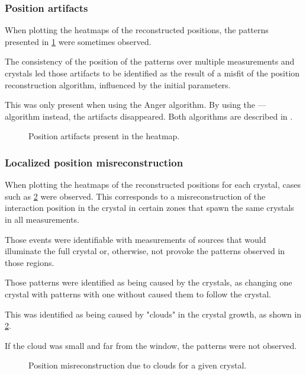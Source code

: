 \subsubsection{Position artifacts}

When plotting the heatmaps of the reconstructed positions, the patterns presented in \ref{fig:PositionArtifactsHeatmap} were sometimes observed.

The consistency of the position of the patterns over multiple measurements and crystals led those artifacts to be identified as the result of a misfit of the position reconstruction algorithm, influenced by the initial parameters.

This was only present when using the Anger algorithm. By using the --- algorithm instead, the artifacts disappeared. Both algorithms are described in \cite{BABIANO20191}.

\begin{figure}[h!]
    \centering
    \caption{Position artifacts present in the heatmap.}%
    \label{fig:PositionArtifactsHeatmap}
\end{figure}

\subsubsection{Localized position misreconstruction}

When plotting the heatmaps of the reconstructed positions for each crystal, cases such as \ref{fig:CloudsHeatmap} were observed. This corresponds to a misreconstruction of the interaction position in the crystal in certain zones that spawn the same crystals in all measurements.

Those events were identifiable with measurements of sources that would illuminate the full crystal or, otherwise, not provoke the patterns observed in those regions.

Those patterns were identified as being caused by the crystals, as changing one crystal with patterns with one without caused them to follow the crystal.

This was identified as being caused by "clouds" in the crystal growth, as shown in \ref{fig:CloudsHeatmap}.

If the cloud was small and far from the window, the patterns were not observed.

\begin{figure}[h!]
    \centering
    \qquad
    \caption{Position misreconstruction due to clouds for a given crystal.}%
    \label{fig:CloudsHeatmap}%
\end{figure}

